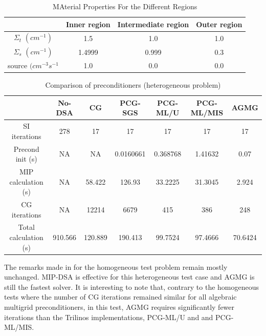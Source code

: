 %
\begin{table}[!htbp]
  \begin{center}
    \caption{MAterial Properties For the Different Regions}
    \begin{tabular}{|c|c|c|c|}
      \hline
       & Inner region & Intermediate region & Outer region \\ \hline
      $\Sigma_t$ $(cm^{-1})$ & 1.5 & 1.0 & 1.0 \\
      $\Sigma_s$ $(cm^{-1})$ & 1.4999 & 0.999 & 0.3 \\
     source $(cm^{-3}s^{-1}$ & 1.0 & 0.0 & 0.0 \\
      \hline
    \end{tabular}
    \label{hex_prop}
  \end{center}
\end{table}
%
%
\begin{table}[!htbp]
  \begin{center}
    \caption{Comparison of preconditioners (heterogeneous problem)}
    \begin{tabular}{|c|c|c|c|c|c|c|}
      \hline
      & No-DSA & CG & PCG-SGS & PCG-ML/U & PCG-ML/MIS & AGMG\\
      \hline
      SI iterations & 278     & 17      & 17        & 17       & 17      & 17  \\
   Precond init (s) & NA      & NA      & 0.0160661 & 0.368768 & 1.41632 &
      0.07  \\
MIP calculation (s) & NA      & 58.422  & 126.93    & 33.2225  & 31.3045 &
      2.924 \\
      CG iterations & NA      & 12214   & 6679      & 415      & 386     & 248  \\
Total calculation (s) & 910.566 & 120.889 & 190.413 & 99.7524  & 97.4666 &
      70.6424 \\      
      \hline
    \end{tabular}
    \label{comparison_hex}
  \end{center}
\end{table}
%
The remarks made in  for the homogeneous test problem
remain mostly unchanged. MIP-DSA is effective for this heterogeneous test case and AGMG is
still the fastest solver. It is interesting to note that, contrary to the
homogeneous tests where the number of CG iterations remained similar for all
algebraic multigrid preconditioners, in this test, AGMG requires
significantly fewer iterations than the Trilinos implementations, PCG-ML/U and and PCG-ML/MIS.

